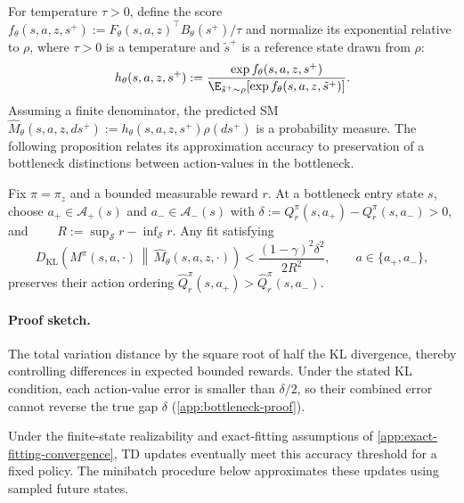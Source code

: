 For temperature $\tau>0$, define the score $f_\theta(s,a,z,s^+):=F_\theta(s,a,z)^\top B_\theta(s^+)/\tau$ and normalize its exponential relative to $\rho$, where $\tau>0$ is a temperature and $\tilde s^+$ is a reference state drawn from $\rho$:
\begin{equation}
    h_\theta(s,a,z,s^+) :=\frac{\exp f_\theta(s,a,z,s^+)} {\E_{\tilde s^+\sim\rho} [\exp f_\theta(s,a,z,\tilde s^+)]}.
    \label{eq:density-model}
\end{equation}
Assuming a finite denominator, the predicted SM $\widehat M_\theta(s,a,z,ds^+) :=h_\theta(s,a,z,s^+)\rho(ds^+)$ is a probability measure.
The following proposition relates its approximation accuracy to preservation of a bottleneck distinctions between action-values in the bottleneck.

\begin{proposition}
\label{prop:bottleneck-preservation}
Fix $\pi=\pi_z$ and a bounded measurable reward $r$.
At a bottleneck entry state $s$, choose $a_+\in\mathcal A_+(s)$ and $a_-\in\mathcal A_-(s)$ with
\(\delta:=Q_r^\pi(s,a_+)-Q_r^\pi(s,a_-)>0,\) and $\qquad R:=\sup_{\mathcal S}r-\inf_{\mathcal S}r.$
Any fit satisfying
\[
    D_{\mathrm{KL}}\!\left( M^\pi(s,a,\cdot) \,\middle\|\, \widehat M_\theta(s,a,z,\cdot) \right) <\frac{(1-\gamma)^2\delta^2}{2R^2}, \qquad a\in\{a_+,a_-\},
\]
preserves their action ordering $ \widehat Q_r^\pi(s,a_+)> \widehat Q_r^\pi(s,a_-).$
\end{proposition}

\paragraph{Proof sketch.} The total variation distance by the square root of half the KL divergence, thereby controlling differences in expected bounded rewards. 
Under the stated KL condition, each action-value error is smaller than $\delta/2$, so their combined error cannot reverse the true gap $\delta$ (\cref{app:bottleneck-proof}).

Under the finite-state realizability and exact-fitting assumptions of \cref{app:exact-fitting-convergence}, TD updates eventually meet this accuracy threshold for a fixed policy.
The minibatch procedure below approximates these updates using sampled future states.

